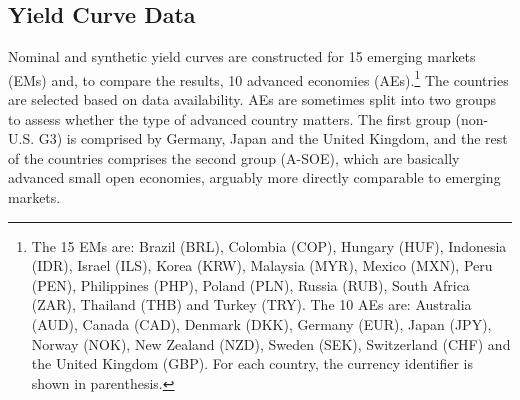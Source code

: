 {%

\subsection{Yield Curve Data}
\iftoggle{toclinks}{\gototoc}{} %

Nominal and synthetic yield curves are constructed for 15 emerging markets (EMs) and, to compare the results, 10 advanced economies (AEs).\footnote{ The 15 EMs are: Brazil (BRL), Colombia (COP), Hungary (HUF), Indonesia (IDR), Israel (ILS), Korea (KRW), Malaysia (MYR), Mexico (MXN), Peru (PEN), Philippines (PHP), Poland (PLN), Russia (RUB), South Africa (ZAR), Thailand (THB) and Turkey (TRY). The 10 AEs are: Australia (AUD), Canada (CAD), Denmark (DKK), Germany (EUR), Japan (JPY), Norway (NOK), New Zealand (NZD), Sweden (SEK), Switzerland (CHF) and the United Kingdom (GBP). For each country, the currency identifier is shown in parenthesis.} 
The countries are selected based on data availability. 
AEs are sometimes split into two groups to assess whether the type of advanced country matters. The first group (non-U.S. G3) is comprised by Germany, Japan and the United Kingdom, and the rest of the countries comprises the second group (A-SOE), which are basically advanced small open economies, arguably more directly comparable to emerging markets.

}
